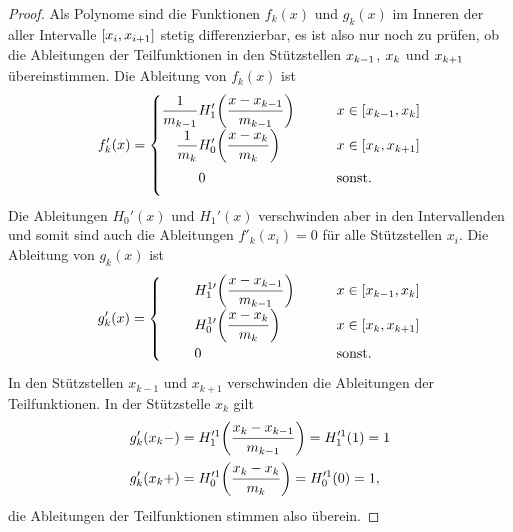 \begin{proof}
Als Polynome sind die Funktionen $f_k(x)$ und $g_k(x)$ im Inneren der
aller Intervalle $[x_{i\mathstrut},x_{i+1\mathstrut}]$ stetig
differenzierbar, es ist also nur noch zu prüfen, ob die Ableitungen
der Teilfunktionen in den Stützstellen $x_{k-1\mathstrut}$, $x_{k\mathstrut}$
und $x_{k+1\mathstrut}$ übereinstimmen.
Die Ableitung von $f_k(x)$ ist
\[
f_k'(x)
=
\begin{cases}
\displaystyle
\frac{1}{m_{k-1\mathstrut}}
H'_1\biggl(\frac{x-x_{k-1\mathstrut}}{m_{k-1\mathstrut}}\biggr)
&\qquad x \in [x_{k-1\mathstrut},x_{k\mathstrut}]\\
\displaystyle
\phantom{\frac{1}{m_{k-1\mathstrut}}}
\llap{$\displaystyle\frac{1}{m_{k\mathstrut}}$}
H'_0\biggl(\frac{x-x_{k\mathstrut}}{m_{k\mathstrut}}\biggr)
&\qquad x \in [x_{k\mathstrut},x_{k+1\mathstrut}]\\
\phantom{\displaystyle\frac{1}{m_{k-1\mathstrut}}}
0&\qquad\text{sonst.}
\end{cases}
\]
Die Ableitungen $H_0'(x)$ und $H_1'(x)$ verschwinden aber in den Intervallenden
und somit sind auch die Ableitungen $f'_k(x_i)=0$ für alle Stützstellen $x_i$.
Die Ableitung von $g_k(x)$ ist
\[
g'_k(x)
=
\begin{cases}
\displaystyle
\phantom{m_{k-1}}
H_1^{1\prime}\biggl(\frac{x-x_{k-1\mathstrut}}{m_{k-1\mathstrut}}\biggr)
&\qquad x\in[x_{k-1\mathstrut},x_{k\mathstrut}]\\
\displaystyle
\phantom{m_{k-1}}
H_0^{1\prime}\biggl(\frac{x-x_{k\mathstrut}}{m_{k\mathstrut}}\biggr)
&\qquad x\in[x_{k\mathstrut},x_{k+1\mathstrut}]\\
\displaystyle
\phantom{m_{k-1}}
0
&\qquad\text{sonst.}
\end{cases}
\]
In den Stützstellen $x_{k-1}$ und $x_{k+1}$ verschwinden die Ableitungen
der Teilfunktionen.
In der Stützstelle $x_k$ gilt
\begin{align*}
g_k'(x_k-)
&=
H_1^{\prime 1}\biggl(
\frac{x_{k\mathstrut}-x_{k-1\mathstrut}}{m_{k-1\mathstrut}}
\biggr)
=
H_1^{\prime 1}(1)
=
1
\\
g_k'(x_k+)
&=
H_0^{\prime 1}\biggl(
\frac{x_{k\mathstrut}-x_{k\mathstrut}}{m_{k\mathstrut}}
\biggr)
=
H_0^{\prime 1}(0)
=
1,
\end{align*}
die Ableitungen der Teilfunktionen stimmen also überein.
\end{proof}


%
%

